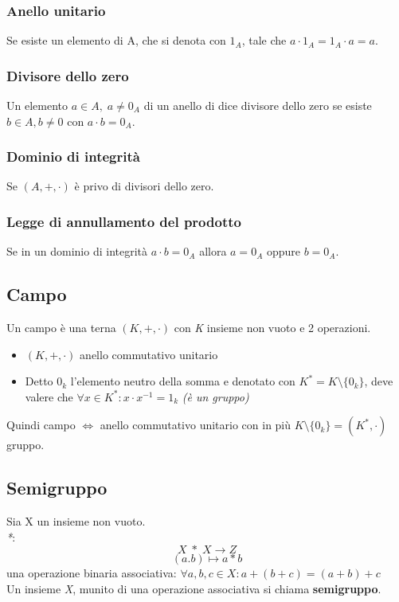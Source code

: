 \subsubsection{Anello unitario} 
Se esiste un elemento di A, che si denota con \(1_A\), tale che \(a\cdot 1_A=1_A\cdot a=a\).

\subsubsection{Divisore dello zero} 
Un elemento \(a\in A,\; a\neq0_A\) di un anello di dice divisore dello zero se esiste \(b\in A,b\neq 0\) con \(a\cdot b=0_A\).

\subsubsection{Dominio di integrità} 
Se \((A,+,\cdot)\) è privo di divisori dello zero.

\subsubsection{Legge di annullamento del prodotto} 
Se in un dominio di integrità \(a\cdot b=0_A\) allora \(a=0_A\) oppure \(b=0_A\).

\subsection{Campo}
Un campo è una terna \((K,+,\cdot)\) con \textit{K} insieme non vuoto e 2 operazioni.
\begin{itemize}
    \item \((K,+,\cdot)\) anello commutativo unitario
    \item Detto \(0_k\) l'elemento neutro della somma e denotato con \(K^*=K\setminus\{0_k\}\), deve valere che \(\forall x\in K^*:x\cdot x^{-1}=1_k\) \textit{(è un gruppo)}
\end{itemize}
Quindi campo \(\Leftrightarrow\) anello commutativo unitario con in più \(K\setminus\{0_k\}=(K^*,\cdot)\) gruppo.

\subsection{Semigruppo}
Sia X un insieme non vuoto. 
\\\textit{*}:
\[X\;*\;X\rightarrow Z\]
\[(a.b)\mapsto a * b\]
una operazione binaria associativa: \(\forall a,b,c\in X: a+(b+c)=(a+b)+c\)
\\
Un insieme \textit{X}, munito di una operazione associativa si chiama \textbf{semigruppo}.

